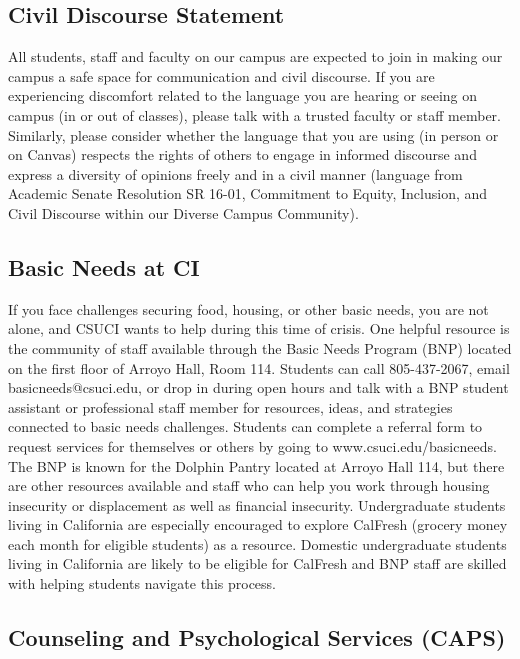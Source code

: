 \documentclass[
  letterpaper,
  DIV=11,
  numbers=noendperiod]{scrartcl}
\begin{document}
\subsection{Civil Discourse Statement}\label{civil-discourse-statement}

All students, staff and faculty on our campus are expected to join in
making our campus a safe space for communication and civil discourse. If
you are experiencing discomfort related to the language you are hearing
or seeing on campus (in or out of classes), please talk with a trusted
faculty or staff member. Similarly, please consider whether the language
that you are using (in person or on Canvas) respects the rights of
others to engage in informed discourse and express a diversity of
opinions freely and in a civil manner (language from Academic Senate
Resolution SR 16-01, Commitment to Equity, Inclusion, and Civil
Discourse within our Diverse Campus Community).

\subsection{Basic Needs at CI}\label{basic-needs-at-ci}

If you face challenges securing food, housing, or other basic needs, you
are not alone, and CSUCI wants to help during this time of crisis. One
helpful resource is the community of staff available through the Basic
Needs Program (BNP) located on the first floor of Arroyo Hall, Room 114.
Students can call 805-437-2067, email basicneeds@csuci.edu, or drop in
during open hours and talk with a BNP student assistant or professional
staff member for resources, ideas, and strategies connected to basic
needs challenges. Students can complete a referral form to request
services for themselves or others by going to www.csuci.edu/basicneeds.
The BNP is known for the Dolphin Pantry located at Arroyo Hall 114, but
there are other resources available and staff who can help you work
through housing insecurity or displacement as well as financial
insecurity. Undergraduate students living in California are especially
encouraged to explore CalFresh (grocery money each month for eligible
students) as a resource. Domestic undergraduate students living in
California are likely to be eligible for CalFresh and BNP staff are
skilled with helping students navigate this process.

\subsection{Counseling and Psychological Services
(CAPS)}\label{counseling-and-psychological-services-caps}
\end{document}
